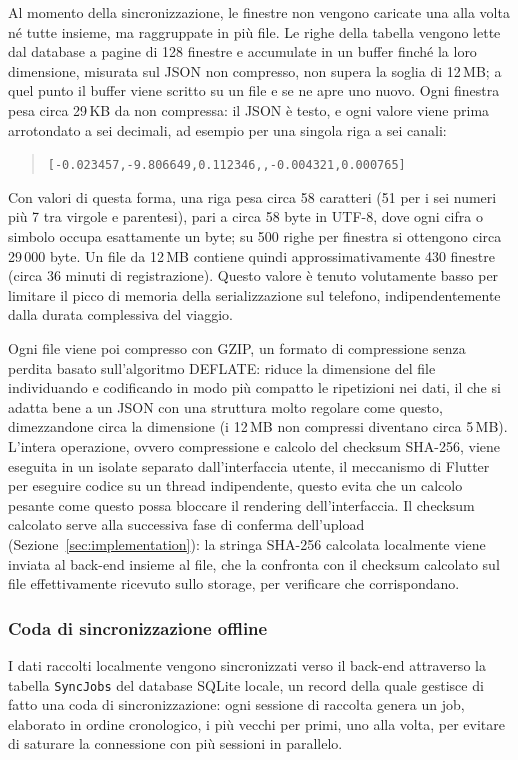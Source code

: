 \documentclass[conference]{IEEEtran}
\begin{document}
Al momento della sincronizzazione, le finestre non vengono caricate
una alla volta né tutte insieme, ma raggruppate in più file. Le righe
della tabella vengono lette dal database a pagine di 128 finestre e
accumulate in un buffer finché la loro dimensione, misurata sul JSON
non compresso, non supera la soglia di 12\,MB; a quel punto il buffer
viene scritto su un file e se ne apre uno nuovo. Ogni finestra pesa
circa 29\,KB da non compressa: il JSON è testo, e ogni valore viene
prima arrotondato a sei decimali, ad esempio per una singola riga a
sei canali:
\begin{quote}
\texttt{[-0.023457,-9.806649,0.112346,,-0.004321,0.000765]}
\end{quote}
Con valori di questa forma, una
riga pesa circa 58 caratteri (51 per i sei numeri più 7 tra virgole e
parentesi), pari a circa 58 byte in UTF-8, dove ogni cifra o simbolo
occupa esattamente un byte; su 500 righe per finestra si ottengono
circa 29\,000 byte. Un file da
12\,MB contiene quindi approssimativamente 430 finestre (circa 36
minuti di registrazione).
Questo valore è tenuto volutamente basso per limitare il picco di
memoria della serializzazione sul telefono, indipendentemente dalla
durata complessiva del viaggio.

Ogni file viene poi compresso con GZIP, un formato di compressione
senza perdita basato sull'algoritmo DEFLATE: riduce la dimensione del
file individuando e codificando in modo più compatto le ripetizioni
nei dati, il che si adatta bene a un JSON con una struttura molto
regolare come questo, dimezzandone circa la dimensione (i 12\,MB non
compressi diventano circa 5\,MB). L'intera operazione, ovvero compressione
e calcolo del checksum SHA-256, viene eseguita in un isolate
separato dall'interfaccia utente, il meccanismo di Flutter per
eseguire codice su un thread indipendente, questo evita che un calcolo pesante come questo
possa bloccare il rendering dell'interfaccia.
Il checksum calcolato serve alla successiva fase di
conferma dell'upload (Sezione~\ref{sec:implementation}): la stringa
SHA-256 calcolata localmente viene inviata al back-end insieme al
file, che la confronta con il checksum calcolato sul file
effettivamente ricevuto sullo storage, per verificare che
corrispondano.

\subsubsection{Coda di sincronizzazione offline}

I dati raccolti localmente vengono sincronizzati verso il back-end
attraverso la tabella \texttt{SyncJobs} del database SQLite locale,
un record della quale gestisce di fatto una coda di sincronizzazione:
ogni sessione di raccolta genera un job, elaborato in ordine
cronologico, i più vecchi per primi, uno alla volta, per evitare
di saturare la connessione con più sessioni in parallelo.
\end{document}
